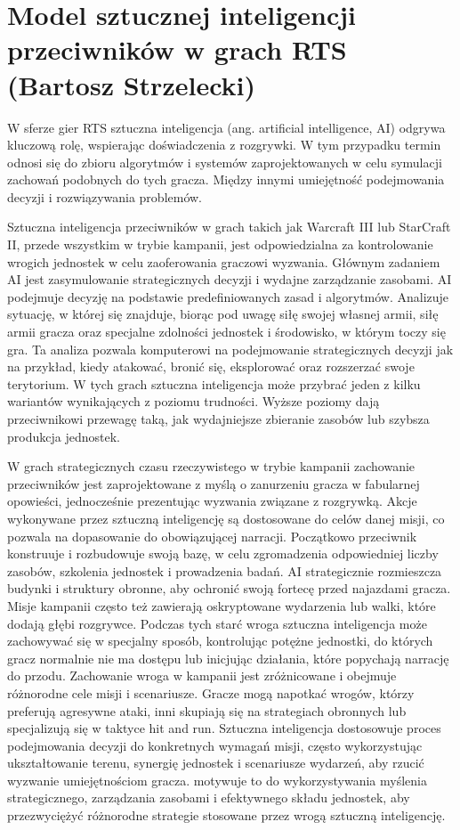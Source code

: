 \section{Model sztucznej inteligencji przeciwników w grach RTS (Bartosz Strzelecki)}
W sferze gier RTS sztuczna inteligencja (ang. artificial intelligence, AI) odgrywa kluczową rolę, wspierając doświadczenia z rozgrywki.
W tym przypadku termin odnosi się do zbioru algorytmów i systemów zaprojektowanych w celu symulacji
zachowań podobnych do tych gracza. Między innymi umiejętność podejmowania decyzji i rozwiązywania problemów.

Sztuczna inteligencja przeciwników w grach takich jak Warcraft III lub StarCraft II, przede wszystkim w trybie kampanii,
jest odpowiedzialna za kontrolowanie wrogich jednostek w celu zaoferowania graczowi wyzwania. Głównym zadaniem AI jest zasymulowanie
strategicznych decyzji i wydajne zarządzanie zasobami.
AI podejmuje decyzję na podstawie predefiniowanych zasad i algorytmów. Analizuje sytuację, w której się znajduje, biorąc pod uwagę
siłę swojej własnej armii, siłę armii gracza oraz specjalne zdolności jednostek i środowisko, w którym toczy się gra.
Ta analiza pozwala komputerowi na podejmowanie strategicznych decyzji jak na przykład, kiedy atakować, bronić się, eksplorować oraz rozszerzać swoje terytorium.
W tych grach sztuczna inteligencja może przybrać jeden z kilku wariantów wynikających z poziomu trudności. Wyższe poziomy
dają przeciwnikowi przewagę taką, jak wydajniejsze zbieranie zasobów lub szybsza produkcja jednostek.

W grach strategicznych czasu rzeczywistego w trybie kampanii zachowanie przeciwników jest zaprojektowane z myślą o zanurzeniu gracza w fabularnej opowieści, jednocześnie
prezentując wyzwania związane z rozgrywką. Akcje wykonywane przez sztuczną inteligencję są dostosowane do celów danej misji, co pozwala
na dopasowanie do obowiązującej narracji.
Początkowo przeciwnik konstruuje i rozbudowuje swoją bazę, w celu zgromadzenia odpowiedniej liczby zasobów, szkolenia jednostek i prowadzenia badań.
AI strategicznie rozmieszcza budynki i struktury obronne, aby ochronić swoją fortecę przed najazdami gracza. 
Misje kampanii często też zawierają oskryptowane wydarzenia lub walki, które dodają głębi rozgrywce. Podczas tych starć wroga sztuczna inteligencja
może zachowywać się w specjalny sposób, kontrolując potężne jednostki, do których gracz normalnie nie ma dostępu lub inicjując działania, które popychają
narrację do przodu.
Zachowanie wroga w kampanii jest zróżnicowane i obejmuje różnorodne cele misji i scenariusze. Gracze mogą napotkać wrogów, którzy preferują agresywne ataki,
inni skupiają się na strategiach obronnych lub specjalizują się w taktyce hit and run. Sztuczna inteligencja dostosowuje proces podejmowania decyzji do
konkretnych wymagań misji, często wykorzystując ukształtowanie terenu, synergię jednostek i scenariusze wydarzeń, aby rzucić wyzwanie umiejętnościom gracza.
motywuje to do wykorzystywania myślenia strategicznego, zarządzania zasobami i efektywnego składu jednostek, aby przezwyciężyć różnorodne strategie stosowane przez wrogą sztuczną inteligencję.
